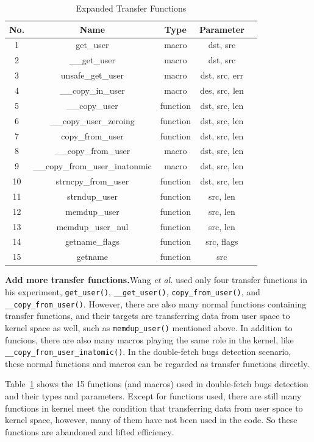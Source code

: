 \documentclass[10pt]{llncs}
\begin{document}
\begin{table}[t!]
\caption{Expanded Transfer Functions}
\centering
\begin{tabular}{ccccc} 
  \hline
  \textbf{No.} & \textbf{Name} & \textbf{Type} & \textbf{Parameter} \\
  \hline
  1 & get\_user & macro & dst, src \\
  2 & \_\_get\_user & macro & dst, src \\
  3 & unsafe\_get\_user & macro & dst, src, err \\
  4 & \_\_copy\_in\_user & macro & des, src, len \\
  5 & \_\_copy\_user & function & dst, src, len \\
  6 & \_\_copy\_user\_zeroing & function & dst, src, len \\
  7 & copy\_from\_user & function & dst, src, len \\
  8 & \_\_copy\_from\_user & macro & dst, src, len \\
  9 & \_\_copy\_from\_user\_inatonmic & macro & dst, src, len \\
  10 & strncpy\_from\_user & function & dst, src, len \\
  11 & strndup\_user & function & src, len \\
  12 & memdup\_user & function & src, len \\
  13 & memdup\_user\_nul & function & src, len \\
  14 & getname\_flags & function & src, flags \\
  15 & getname & function & src \\
  \hline
\end{tabular}
\label{transfer-func}
\end{table}

\textbf{Add more transfer functions.}Wang \textit{et al.} used only four transfer functions in his experiment, \verb:get_user():, \verb:__get_user():, \verb:copy_from_user():, and \verb:__copy_from_user():. However, there are also many normal functions containing transfer functions, and their targets are transferring data from user space to kernel space as well, such as \verb:memdup_user(): mentioned above. In addition to funcions, there are also many macros playing the same role in the kernel, like \verb:__copy_from_user_inatomic():.
In the double-fetch bugs detection scenario, these normal functions and macros can be regarded as transfer functions directly. 

Table~\ref{transfer-func} shows the 15 functions (and macros) used in double-fetch bugs detection and their types and parameters. Except for functions used, there are still many functions in kernel meet the condition that transferring data from user space to kernel space, however, many of them have not been used in the code. So these functions are abandoned and lifted efficiency.
\end{document}
